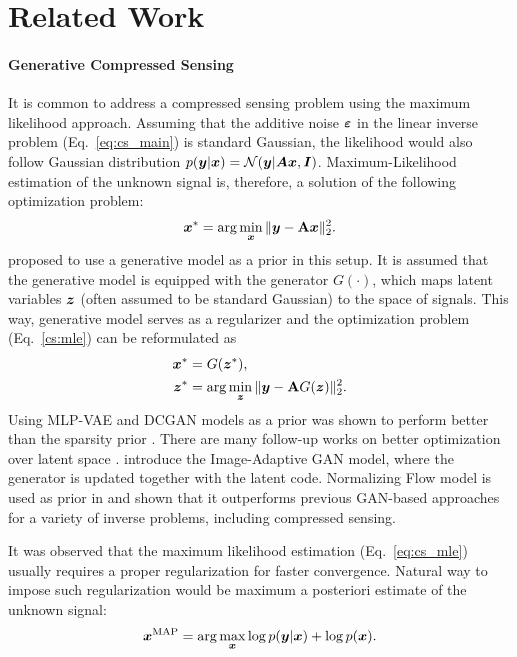 \section{Related Work} \label{sec:related_works}


\paragraph{Generative Compressed Sensing} \label{sec:related_gen_cs}
It is common to address a compressed sensing problem using the maximum likelihood approach. Assuming that the additive noise ${\bm{\varepsilon}}$ in the linear inverse problem (Eq.~\ref{eq:cs_main}) is standard Gaussian, the likelihood would also follow Gaussian distribution $p({\bm{y}}|{\bm{x}}) = \mathcal{N}({\bm{y}}| {\bm{A}}{\bm{x}}, {\bm{I}})$. Maximum-Likelihood estimation of the unknown signal is, therefore, a solution of the following optimization problem:
\begin{equation}\label{cs:mle}
    \vx^* = \arg\min_\vx \| \vy - \mathbf{A}\vx\|_2^2.
\end{equation}
\cite{Bora2017-as} proposed to use a generative model as a prior in this setup. It is assumed that the generative model is equipped with the generator $G(\cdot)$, which maps latent variables ${\bm{z}}$ (often assumed to be standard Gaussian) to the space of signals. This way, generative model serves as a regularizer and the optimization problem (Eq.~\ref{cs:mle}) can be reformulated as
\begin{align}
    \vx^* &= G(\vz^*),\\
    \vz^* &= \arg \min_{\vz} \|\vy - \mathbf{A} G(\vz)\|_2^2. \label{eq:cs_mle}
\end{align}
Using MLP-VAE and DCGAN models as a prior was shown to perform better than the sparsity prior \cite{Bora2017-as}. There are many follow-up works on better optimization over latent space \cite{daras_intermediate_2021,lei_inverting_2019}. \citet{Hussein2020-yk} introduce the Image-Adaptive GAN model, where the generator is updated together with the latent code. Normalizing Flow model is used as prior in \citet{Asim2019-lv} and shown that it outperforms previous GAN-based approaches for a variety of inverse problems, including compressed sensing. 

It was observed that the maximum likelihood estimation (Eq.~\ref{eq:cs_mle}) usually requires a proper regularization for faster convergence. Natural way to impose such regularization would be maximum a posteriori estimate of the unknown signal:
\begin{equation}
    {\bm{x}}^{\text{MAP}} = \arg \max_{\bm{x}} \log p({\bm{y}}|{\bm{x}}) + \log p({\bm{x}}).
\end{equation}

